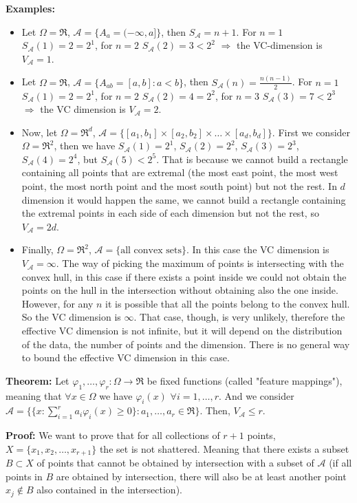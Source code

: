 \documentclass[11pt, english]{article}
\begin{document}
\textbf{Examples:}
\begin{itemize}
	\item Let $\Omega=\Re$, $\mathcal{A}=\{A_a=(-\infty,a]\}$, then $S_{\mathcal{A}}=n+1$. For $n=1$ $S_{\mathcal{A}}(1)=2=2^1$, for $n=2$ $S_{\mathcal{A}}(2)=3<2^2$ $\Longrightarrow$ the VC-dimension is $V_{\mathcal{A}}=1$.
	\item Let $\Omega=\Re$, $\mathcal{A}=\{A_{ab}=[a,b]: a<b\}$, then $S_{\mathcal{A}}(n)=\frac{n(n-1)}{2}$. For $n=1$ $S_{\mathcal{A}}(1)=2=2^1$, for $n=2$ $S_{\mathcal{A}}(2)=4=2^2$, for $n=3$ $S_{\mathcal{A}}(3)=7<2^3$ $\Longrightarrow$ the VC dimension is $V_{\mathcal{A}}=2$.
	\item Now, let $\Omega=\Re^d$, $\mathcal{A}=\{[a_1,b_1]\times[a_2,b_2]\times\dots \times[a_d,b_d]\}$. First we consider $\Omega=\Re^2$, then we have $S_{\mathcal{A}}(1)=2^1$, $S_{\mathcal{A}}(2)=2^2$, $S_{\mathcal{A}}(3)=2^3$, $S_{\mathcal{A}}(4)=2^4$, but $S_{\mathcal{A}}(5)<2^5$. That is because we cannot build a rectangle containing all points that are extremal (the most east point, the most west point, the most north point and the most south point) but not the rest. In $d$ dimension it would happen the same, we cannot build a rectangle containing the extremal points in each side of each dimension but not the rest, so $V_{\mathcal{A}}=2d$.%
	\item Finally, $\Omega=\Re^2$, $\mathcal{A}=\{\text{all convex sets}\}$. In this case the VC dimension is $V_{\mathcal{A}}=\infty$. The way of picking the maximum of points is intersecting with the convex hull, in this case if there exists a point inside we could not obtain the points on the hull in the intersection without obtaining also the one inside. However, for any $n$ it is possible that all the points belong to the convex hull. So the VC dimension is $\infty$. That case, though, is very unlikely, therefore the effective VC dimension is not infinite, but it will depend on the distribution of the data, the number of points and the dimension. There is no general way to bound the effective VC dimension in this case.
\end{itemize} 
\textbf{Theorem:} Let $\varphi_1,\dots,\varphi_r:\Omega\longrightarrow\Re$ be fixed functions (called "feature mappings"), meaning that $\forall x\in \Omega$ we have $\varphi_i(x)$ $\forall i=1,\dots,r$. And we consider $\mathcal{A}=\{\{x:\sum\limits_{i=1}^ra_i\varphi_i(x)\geq 0\}:a_1,\dots,a_r\in\Re\}$. Then, $V_{\mathcal{A}}\leq r$. %

\textbf{Proof:} We want to prove that for all collections of $r+1$ points, $X=\{x_1,x_2,\dots,x_{r+1}\}$ the set is not shattered. Meaning that there exists a subset $B\subset X$ of points that cannot be obtained by intersection with a subset of $\mathcal{A}$ (if all points in $B$ are obtained by intersection, there will also be at least another point $x_j\notin B$ also contained in the intersection).\\
\end{document}
